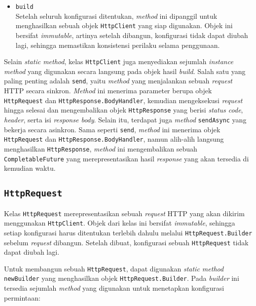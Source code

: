 \begin{itemize}
    \item \texttt{build}\\
    Setelah seluruh konfigurasi ditentukan, \textit{method} ini dipanggil untuk menghasilkan sebuah objek \texttt{HttpClient} yang siap digunakan. Objek ini bersifat \textit{immutable}, artinya setelah dibangun, konfigurasi tidak dapat diubah lagi, sehingga memastikan konsistensi perilaku selama penggunaan.
\end{itemize}

Selain \textit{static method}, kelas \texttt{HttpClient} juga menyediakan sejumlah \textit{instance method} yang digunakan secara langsung pada objek hasil \textit{build}. Salah satu yang paling penting adalah \texttt{send}, yaitu \textit{method} yang menjalankan sebuah \textit{request} HTTP secara sinkron. \textit{Method} ini menerima parameter berupa objek \texttt{HttpRequest} dan \texttt{HttpResponse.BodyHandler}, kemudian mengeksekusi \textit{request} hingga selesai dan mengembalikan objek \texttt{HttpResponse} yang berisi \textit{status code}, \textit{header}, serta isi \textit{response body}. Selain itu, terdapat juga \textit{method} \texttt{sendAsync} yang bekerja secara asinkron. Sama seperti \texttt{send}, \textit{method} ini menerima objek \texttt{HttpRequest} dan \texttt{HttpResponse.BodyHandler}, namun alih-alih langsung menghasilkan \texttt{HttpResponse}, \textit{method} ini mengembalikan sebuah \texttt{CompletableFuture} yang merepresentasikan hasil \textit{response} yang akan tersedia di kemudian waktu.



\subsection{\texttt{HttpRequest}}
\label{subsec:0228-httprequest}


Kelas \texttt{HttpRequest} merepresentasikan sebuah \textit{request} HTTP yang akan dikirim menggunakan \texttt{HttpClient}. Objek dari kelas ini bersifat \textit{immutable}, sehingga setiap konfigurasi harus ditentukan terlebih dahulu melalui \texttt{HttpRequest.Builder} sebelum \textit{request} dibangun. Setelah dibuat, konfigurasi sebuah \texttt{HttpRequest} tidak dapat diubah lagi.

Untuk membangun sebuah \texttt{HttpRequest}, dapat digunakan \textit{static method} \texttt{newBuilder} yang menghasilkan objek \texttt{HttpRequest.Builder}. Pada \textit{builder} ini tersedia sejumlah \textit{method} yang digunakan untuk menetapkan konfigurasi permintaan:

